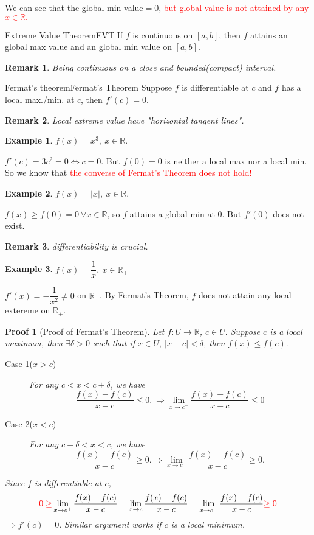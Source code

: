 \documentclass[12pt,a4paper]{article}
\newcommand{\R}{\mathbb{R}}
\theoremstyle{mystyle}
\numberwithin{figure}{subsection}
\newtheorem{exm}{Example}[subsection] %
\newtheorem{rem}{Remark}[subsection] %
\newtheorem{pf}{Proof}[subsection]
\newenvironment{ex}{\begin{exBox}\begin{exm}}{\end{exm}\end{exBox}}
\begin{document}
We can see that the global min value$=0$, \textcolor{red}{but global value is not attained by any $x \in \R.$}
\begin{thm}{Extreme Value Theorem}{EVT}
    If $f$ is continuous on $[a,b]$, then $f$ attains an global max value and an global min value on $[a,b]$.
\end{thm}
\begin{rem}
\textcolor{amethyst}{Being continuous on a close and bounded(compact) interval.}
\end{rem}
\begin{thm}{Fermat's theorem}{Fermat's Theorem}
    Suppose $f$ is differentiable at $c$ and $f$ has a local max./min. at $c$, then $f'(c) = 0.$
\end{thm}
\begin{rem}
\textcolor{amethyst}{Local extreme value have "horizontal tangent lines".}
\end{rem}
\begin{ex}
    $f(x)=x^3, \ x \in \R.$
\end{ex}
$f'(c) = 3c^2 = 0 \Longleftrightarrow c = 0.$ But $f(0)=0$ is neither a local max nor a local min. \\
So we know that \textcolor{red}{the converse of Fermat's Theorem does not hold!}
\begin{ex}
$f(x)=|x|, \ x\in \R.$
\end{ex}
$f(x) \ge f(0)=0 \ \forall x \in \R$, so $f$ attains a global min at $0$. But $f'(0)$ does not exist.
\begin{rem}
    \textcolor{amethyst}{differentiability is crucial.}
\end{rem}
\begin{ex}
    $f(x)=\dfrac{1}{x}, \ x \in \R_+$
\end{ex}
$f'(x) = -\dfrac{1}{x^2} \neq 0$ on $\R_+$. By Fermat's Theorem, $f$ does not attain any local extereme on $\R_+.$
\begin{pf}[Proof of Fermat's Theorem]
Let $f:U \longrightarrow \R$, $c \in U.$ Suppose $c$ is a local maximum, then $\exists \delta > 0$ such that if $x \in U, \ |x-c|<\delta$, then $f(x) \le f(c).$
\begin{description}
    \item[Case 1($x > c$)] For any $c<x<c+\delta$, we have
    \[
    \frac{f(x)-f(c)}{x-c} \le 0. \ \Rightarrow \lim_{x \to c^+}\frac{f(x)-f(c)}{x-c} \le 0
    \]
    \item[Case 2($x<c$)] For any $c-\delta<x<c$, we have
    \[
    \frac{f(x)-f(c)}{x-c} \ge 0. \Rightarrow \lim_{x \to c^-} \frac{f(x)-f(c)}{x-c} \ge 0.
    \]
\end{description}
Since $f$ is differentiable at $c$,
\[
\textcolor{red}{0 \ge} \lim_{x \to c^+}\frac{f(x)-f(c)}{x-c} = \lim_{x \to c}\frac{f(x)-f(c)}{x-c} =\lim_{x \to c^-}\frac{f(x)-f(c)}{x-c} \textcolor{red}{\ge 0}
\]
$\Rightarrow f'(c)=0.$ Similar argument works if $c$ is a local minimum.
\end{pf}
\end{document}
